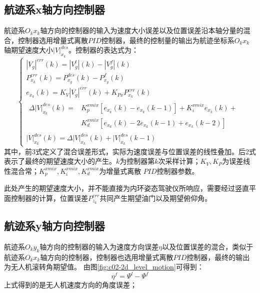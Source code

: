 \subsection{航迹系x轴方向控制器}
航迹系$O_kx_k$轴方向的控制器的输入为速度大小误差以及位置误差沿本轴分量的混合，控制器选用增量式离散$PID$控制器，最终的控制量的输出为航迹坐标系$O_kx_k$轴期望速度大小${|V|}_{x_k}^{des}$。控制器的表达式为：
\begin{equation}
    \left\{
    \begin{array}{l}
        |V_g|^{err}(k)=|V_g^{l}|(k)-|V_g^{f}|(k)\\
        P_{x_k}^{err}(k)=P_{x_g}^{des}(k)-P_{x_g}^{f}(k)\\
        e_{x_k}(k)=K_V|V_g|^{err}(k)+K_{Px}P_{x_k}^{err}(k)\\
        \begin{aligned}
        \Delta{|V|}_{x_k}^{des}(k)=&K_{p}^{xmix}[e_{x_k}(k)-e_{x_k}(k-1)]+K_{i}^{xmix}e_{x_k}(k)+\\
        &K_{d}^{xmix}[e_{x_k}(k)-2e_{x_k}(k-1)+e_{x_k}(k-2)]
        \end{aligned}
        \\
        {|V|}_{x_k}^{des}(k)=\Delta{|V|}_{x_k}^{des}(k)+{|V|}_{x_k}^{des}(k-1)
    \end{array}
    \right .
    \label{xk_vel_gen_equ}
\end{equation}
其中，前3式定义了混合误差形式，实际为速度误差与位置误差的线性叠加。后2式表示了最终的期望速度大小的产生。$k$为控制器第$k$次采样计算；$K_V,K_P$为误差线性混合常；$K_{p}^{xmix},K_{i}^{xmix},K_{d}^{xmix}$为增量式离散
$PID$控制器参数。

此处产生的期望速度大小，并不能直接为内环姿态驾驶仪所响应，需要经过竖直平面控制器的计算，位置误差$P_{z_k}^{err}$共同产生期望油门以及期望俯仰角。
\subsection{航迹系y轴方向控制器}
航迹系$O_ky_k$轴方向的控制器的输入为速度方向误差$\eta$以及位置误差的混合，类似于航迹系$O_kx_k$轴方向的控制器，控制器也选用增量式离散$PID$控制器，最终的输出为无人机滚转角期望值。
由图\ref{fig:c02-2d_level_motion}可得到：
\begin{equation}
    \eta^f=\Psi^l-\Psi^f
    \label{yaw_error}
\end{equation}
上式得到的是无人机速度方向的角度误差；

